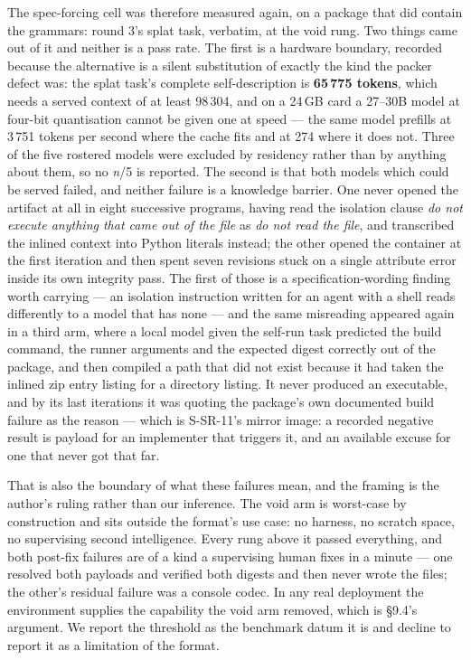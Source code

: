 \documentclass[10pt,twocolumn,letterpaper]{article}
\begin{document}
The spec-forcing cell was therefore measured again, on a package that did contain the grammars: round 3's splat task, verbatim, at the void rung. Two things came out of it and neither is a pass rate. The first is a hardware boundary, recorded because the alternative is a silent substitution of exactly the kind the packer defect was: the splat task's complete self-description is \textbf{65\,775 tokens}, which needs a served context of at least 98\,304, and on a 24\,GB card a 27--30B model at four-bit quantisation cannot be given one at speed --- the same model prefills at 3\,751 tokens per second where the cache fits and at 274 where it does not. Three of the five rostered models were excluded by residency rather than by anything about them, so no \emph{n}/5 is reported. The second is that both models which could be served failed, and neither failure is a knowledge barrier. One never opened the artifact at all in eight successive programs, having read the isolation clause \emph{do not execute anything that came out of the file} as \emph{do not read the file}, and transcribed the inlined context into Python literals instead; the other opened the container at the first iteration and then spent seven revisions stuck on a single attribute error inside its own integrity pass. The first of those is a specification-wording finding worth carrying --- an isolation instruction written for an agent with a shell reads differently to a model that has none --- and the same misreading appeared again in a third arm, where a local model given the self-run task predicted the build command, the runner arguments and the expected digest correctly out of the package, and then compiled a path that did not exist because it had taken the inlined zip entry listing for a directory listing. It never produced an executable, and by its last iterations it was quoting the package's own documented build failure as the reason --- which is S-SR-11's mirror image: a recorded negative result is payload for an implementer that triggers it, and an available excuse for one that never got that far.

That is also the boundary of what these failures mean, and the framing is the author's ruling rather than our inference. The void arm is worst-case by construction and sits outside the format's use case: no harness, no scratch space, no supervising second intelligence. Every rung above it passed everything, and both post-fix failures are of a kind a supervising human fixes in a minute --- one resolved both payloads and verified both digests and then never wrote the files; the other's residual failure was a console codec. In any real deployment the environment supplies the capability the void arm removed, which is \S9.4's argument. We report the threshold as the benchmark datum it is and decline to report it as a limitation of the format.
\end{document}
